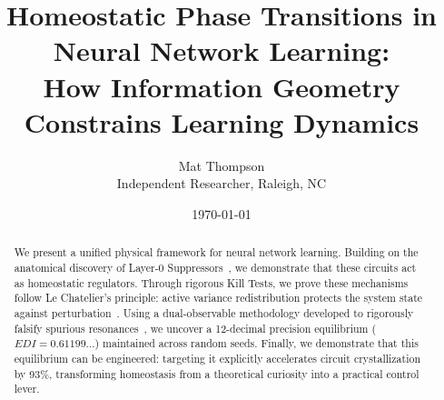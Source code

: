 \documentclass[11pt]{article}
\title{Homeostatic Phase Transitions in Neural Network Learning:\\How Information Geometry Constrains Learning Dynamics}
\author{Mat Thompson\\Independent Researcher, Raleigh, NC}
\date{\today}
\begin{document}
\maketitle

\begin{abstract}
We present a unified physical framework for neural network learning. Building on the anatomical discovery of Layer-0 Suppressors~\cite{thompson2025layer0}, we demonstrate that these circuits act as homeostatic regulators. Through rigorous Kill Tests, we prove these mechanisms follow Le Chatelier's principle: active variance redistribution protects the system state against perturbation~\cite{thompson2025compensation}. Using a dual-observable methodology developed to rigorously falsify spurious resonances~\cite{thompson2025timescale}, we uncover a 12-decimal precision equilibrium ($EDI = 0.61199...$) maintained across random seeds. Finally, we demonstrate that this equilibrium can be engineered: targeting it explicitly accelerates circuit crystallization by 93\%, transforming homeostasis from a theoretical curiosity into a practical control lever.
\end{abstract}












\nocite{*}


\end{document}
